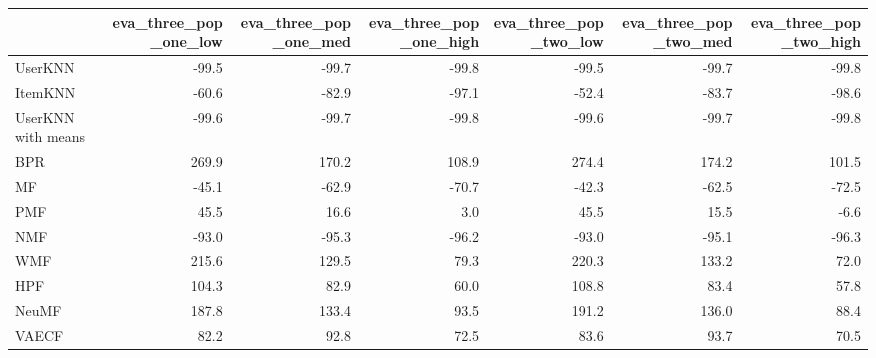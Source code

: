 \begin{tabular}{lrrrrrr}
\toprule
{} &  eva\_three\_pop\_one\_low &  eva\_three\_pop\_one\_med &  eva\_three\_pop\_one\_high &  eva\_three\_pop\_two\_low &  eva\_three\_pop\_two\_med &  eva\_three\_pop\_two\_high \\
\midrule
UserKNN            &                  -99.5 &                  -99.7 &                   -99.8 &                  -99.5 &                  -99.7 &                   -99.8 \\
ItemKNN            &                  -60.6 &                  -82.9 &                   -97.1 &                  -52.4 &                  -83.7 &                   -98.6 \\
UserKNN with means &                  -99.6 &                  -99.7 &                   -99.8 &                  -99.6 &                  -99.7 &                   -99.8 \\
BPR                &                  269.9 &                  170.2 &                   108.9 &                  274.4 &                  174.2 &                   101.5 \\
MF                 &                  -45.1 &                  -62.9 &                   -70.7 &                  -42.3 &                  -62.5 &                   -72.5 \\
PMF                &                   45.5 &                   16.6 &                     3.0 &                   45.5 &                   15.5 &                    -6.6 \\
NMF                &                  -93.0 &                  -95.3 &                   -96.2 &                  -93.0 &                  -95.1 &                   -96.3 \\
WMF                &                  215.6 &                  129.5 &                    79.3 &                  220.3 &                  133.2 &                    72.0 \\
HPF                &                  104.3 &                   82.9 &                    60.0 &                  108.8 &                   83.4 &                    57.8 \\
NeuMF              &                  187.8 &                  133.4 &                    93.5 &                  191.2 &                  136.0 &                    88.4 \\
VAECF              &                   82.2 &                   92.8 &                    72.5 &                   83.6 &                   93.7 &                    70.5 \\
\bottomrule
\end{tabular}
